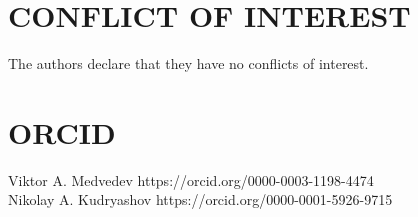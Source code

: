\documentclass[preprint,12pt]{elsarticle}
\begin{document}
\section*{CONFLICT OF INTEREST}
The authors declare that they have no conflicts of interest.
\section*{ORCID}
Viktor A. Medvedev https://orcid.org/0000-0003-1198-4474\\
Nikolay A. Kudryashov https://orcid.org/0000-0001-5926-9715



\end{document}
